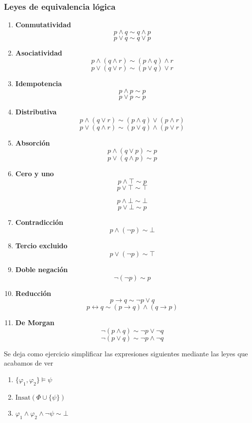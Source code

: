 \subsubsection{Leyes de equivalencia lógica}\label{sec:Leyes de equivalencia logica}
\begin{enumerate}
	\item \textbf{Conmutatividad}
	\[ p \wedge q \sim q \wedge p \]
	\[ p \lor q \sim q \lor p \]
	\item \textbf{Asociatividad}
	\[ p \wedge (q \wedge r) \sim (p \wedge q) \wedge r \]
	\[ p \lor (q \lor r) \sim (p \lor q) \lor r \]
	\item \textbf{Idempotencia}
	\[ p \wedge p \sim p\]
	\[ p \lor p \sim p\]
	\item \textbf{Distributiva}
	\[ p \wedge (q \lor r) \sim (p \wedge q) \lor (p \wedge r) \]
	\[ p \lor (q \wedge r) \sim (p \lor q) \wedge (p \lor r) \]
	\item \textbf{Absorción}
	\[ p \wedge (q \lor p) \sim p \]
	\[ p \lor (q \wedge p) \sim p \]
	\item \textbf{Cero y uno}
	\[ p \wedge \top \sim p \]
	\[ p \lor \top \sim \top \]
	
	\[ p \wedge \bot \sim \bot \]
	\[ p \lor \bot \sim p \]
	\item \textbf{Contradicción}
	\[ p \wedge (\neg p) \sim \bot \]
	\item \textbf{Tercio excluido}
	\[ p \lor (\neg p) \sim \top \]
	\item \textbf{Doble negación}
	\[ \neg (\neg p) \sim p \]
	\item \textbf{Reducción}
	\[ p \rightarrow q \sim \neg p \lor q \]
	\[ p \leftrightarrow q \sim (p \rightarrow q) \wedge (q \rightarrow p) \]
	\item \textbf{De Morgan}
	\[ \neg(p \wedge q) \sim \neg p \lor \neg q\]
	\[ \neg(p \lor q) \sim \neg p \wedge \neg q\]
\end{enumerate}

Se deja como ejercicio simplificar las expresiones siguientes mediante las leyes que acabamos de ver 
\begin{enumerate}
	\item $ \{ \varphi_1, \varphi_2 \} \models \psi $
	\item $ \mbox{Insat}(\Phi \cup \{\psi\} ) $
	\item $ \varphi_1 \wedge \varphi_2 \wedge \neg \psi \sim \bot $
\end{enumerate}